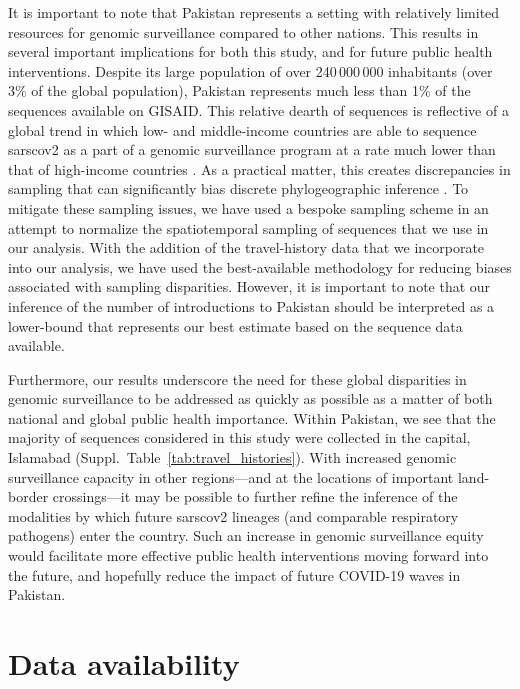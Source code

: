 It is important to note that Pakistan represents a setting with relatively limited resources for genomic surveillance compared to other nations.
This results in several important implications for both this study, and for future public health interventions.
Despite its large population of over 240\,000\,000 inhabitants (over 3\% of the global population), Pakistan represents much less than 1\% of the sequences available on GISAID.
This relative dearth of sequences is reflective of a global trend in which low- and middle-income countries are able to sequence \gls{sarscov2} as a part of a genomic surveillance program at a rate much lower than that of high-income countries \citep{brito2022global}.
As a practical matter, this creates discrepancies in sampling that can significantly bias discrete phylogeographic inference \citep{layan2023impact}.
To mitigate these sampling issues, we have used a bespoke sampling scheme in an attempt to normalize the spatiotemporal sampling of sequences that we use in our analysis.
With the addition of the travel-history data that we incorporate into our analysis, we have used the best-available methodology for reducing biases associated with sampling disparities.
However, it is important to note that our inference of the number of introductions to Pakistan should be interpreted as a lower-bound that represents our best estimate based on the sequence data available.

Furthermore, our results underscore the need for these global disparities in genomic surveillance to be addressed as quickly as possible as a matter of both national and global public health importance.
Within Pakistan, we see that the majority of sequences considered in this study were collected in the capital, Islamabad (Suppl.~Table~\ref{tab:travel_histories}).
With increased genomic surveillance capacity in other regions---and at the locations of important land-border crossings---it may be possible to further refine the inference of the modalities by which future \gls{sarscov2} lineages (and comparable respiratory pathogens) enter the country.
Such an increase in genomic surveillance equity would facilitate more effective public health interventions moving forward into the future, and hopefully reduce the impact of future COVID-19 waves in Pakistan.

\section*{Data availability}

